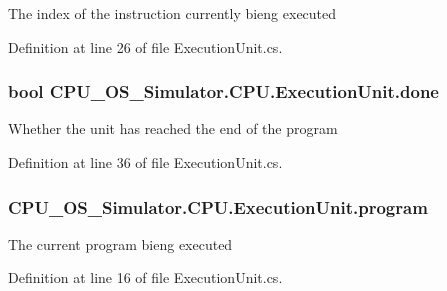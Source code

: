 The index of the instruction currently bieng executed 



Definition at line 26 of file Execution\+Unit.\+cs.

\hypertarget{class_c_p_u___o_s___simulator_1_1_c_p_u_1_1_execution_unit_aa62cb66691fd4d782a4fa5c70843da6e}{}
\subsubsection[{done}]{\setlength{\rightskip}{0pt plus 5cm}bool C\+P\+U\+\_\+\+O\+S\+\_\+\+Simulator.\+C\+P\+U.\+Execution\+Unit.\+done\hspace{0.3cm}{\ttfamily [private]}}\label{class_c_p_u___o_s___simulator_1_1_c_p_u_1_1_execution_unit_aa62cb66691fd4d782a4fa5c70843da6e}


Whether the unit has reached the end of the program 



Definition at line 36 of file Execution\+Unit.\+cs.

\hypertarget{class_c_p_u___o_s___simulator_1_1_c_p_u_1_1_execution_unit_a192670bee8ca089c38e9989350f658d6}{}
\subsubsection[{program}]{ C\+P\+U\+\_\+\+O\+S\+\_\+\+Simulator.\+C\+P\+U.\+Execution\+Unit.\+program\hspace{0.3cm}{\ttfamily [private]}}\label{class_c_p_u___o_s___simulator_1_1_c_p_u_1_1_execution_unit_a192670bee8ca089c38e9989350f658d6}


The current program bieng executed 



Definition at line 16 of file Execution\+Unit.\+cs.

